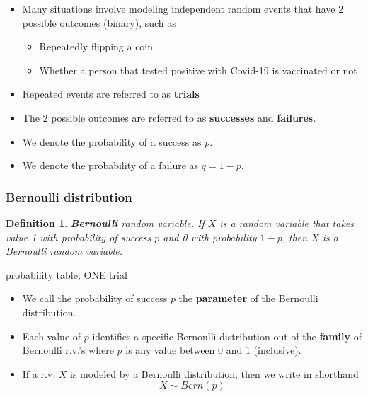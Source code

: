 \documentclass[12pt]{amsart}
\newtheorem{definition}[theorem]{Definition}
\begin{document}
{\begin{itemize}
\item Many situations involve modeling independent random events that have 2 possible outcomes (binary), such as
	\begin{itemize}
	\item Repeatedly flipping a coin
	\item Whether a person that tested positive with Covid-19 is vaccinated or not
	\end{itemize}
\item Repeated events are referred to as \textbf{trials}
\item The 2 possible outcomes are referred to as \textbf{successes} and \textbf{failures}.
\item We denote the probability of a success as $p$. 
\item We denote the probability of a failure as $q = 1-p$. 
\end{itemize}


\vspace{.5cm}
\subsubsection{Bernoulli distribution}



\begin{definition}{\textbf{Bernoulli} random variable.} \newline
If $X$ is a random variable that takes value 1 with probability of success $p$ and 0 with probability $1-p$, then $X$ is a Bernoulli random variable. 
\end{definition}
\color{blue}
probability table; ONE trial
\color{black}

\begin{itemize}
\item We call the probability of success $p$ the \textbf{parameter} of the Bernoulli distribution. 
\item Each value of $p$ identifies a specific Bernoulli distribution out of the \textbf{family} of Bernoulli r.v.'s where $p$ is any value between 0 and 1 (inclusive). 
\item If a r.v. $X$ is modeled by a Bernoulli distribution, then we write in shorthand
\color{blue}
$$X\sim Bern(p)$$
\color{black}
\end{itemize}

}
\end{document}
